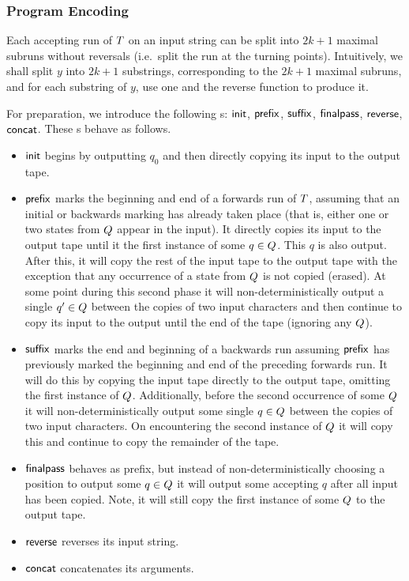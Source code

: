 \subsubsection{Program Encoding}

Each accepting run of $T$ on an input string can be split into $2k+1$
maximal subruns without reversals (i.e.\ split the run at the turning points).
%
Intuitively, we shall split $y$ into $2k+1$ substrings, corresponding to the
$2k+1$ maximal subruns, and for each substring of $y$, use one \PT{} and the
reverse function to produce it.


For preparation, we introduce the following \FT{}s:
    $\mathsf{init}$,
    $\mathsf{prefix}$,
    $\mathsf{suffix}$,
    $\mathsf{finalpass}$,
    $\mathsf{reverse}$,
    $\mathsf{concat}$.
These \FT{}s behave as follows.
\begin{itemize}
\item
    $\mathsf{init}$ begins by outputting $q_0$ and then directly copying its input to
    the output tape.

\item
    $\mathsf{prefix}$ marks the beginning and end of a forwards run of $T$,
    assuming that an initial or backwards marking has already taken place (that
    is, either one or two states from $Q$ appear in the input).
    It directly copies its input to the output tape until it the first instance
    of some
    $q \in Q$.
    This $q$ is also output.
    After this, it will copy the rest of the input tape to the output tape with
    the exception that any occurrence of a state from $Q$ is not copied
    (erased).
    At some point during this second phase it will non-deterministically output
    a single
    $q' \in Q$
    between the copies of two input characters and then continue to copy its
    input to the output until the end of the tape (ignoring any $Q$).

\item
    $\mathsf{suffix}$ marks the end and beginning of a backwards run assuming $\mathsf{prefix}$
    has previously marked the beginning and end of the preceding forwards run.
    It will do this by copying the input tape directly to the output tape,
    omitting the first instance of $Q$.
    Additionally, before the second occurrence of some $Q$ it will
    non-deterministically output some single $q \in Q$ between the
    copies of two input characters.
    On encountering the second instance of $Q$ it will copy this and
    continue to copy the remainder of the tape.

\item
    $\mathsf{finalpass}$ behaves as prefix, but instead of non-deterministically
    choosing a position to output some
    $q \in Q$
    it will output some accepting $q$ after all input has been copied.
    Note, it will still copy the first instance of some $Q$ to the
    output tape.

\item
    $\mathsf{reverse}$ reverses its input string.

\item
    $\mathsf{concat}$ concatenates its arguments.
\end{itemize}


